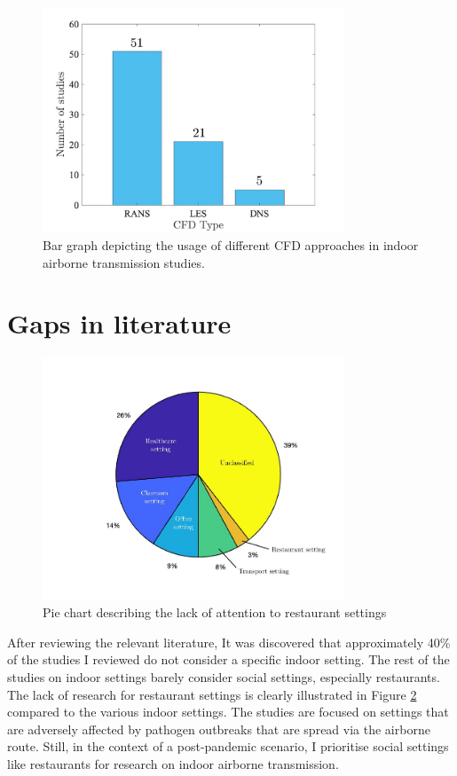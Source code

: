 \documentclass[a4paper,12pt]{elsarticle}
\begin{document}
\begin{figure}[ht]
    \centering
    \includegraphics[width=0.8\textwidth]{figures/cfd.jpg}
    \caption{Bar graph depicting the usage of different CFD approaches in indoor airborne transmission studies.}
    \label{fig:cfd}
\end{figure}

\section{Gaps in literature}

\begin{figure}[ht]
    \centering
    \includegraphics[width=0.8\textwidth]{figures/pie.jpg}
    \caption{Pie chart describing the lack of attention to restaurant settings}
    \label{fig:pie}
\end{figure}

After reviewing the relevant literature, It was discovered that approximately 40\% of the studies I reviewed do not consider a specific indoor setting. The rest of the studies on indoor settings barely consider social settings, especially restaurants. The lack of research for restaurant settings is clearly illustrated in Figure \ref{fig:pie} compared to the various indoor settings. The studies are focused on settings that are adversely affected by pathogen outbreaks that are spread via the airborne route. Still, in the context of a post-pandemic scenario, I prioritise social settings like restaurants for research on indoor airborne transmission. 
\end{document}
